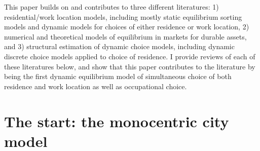 This paper builds on and contributes to three different literatures: 1) residential/work location models, including mostly static equilibrium sorting models and dynamic models for choices of either residence or work location, 2) numerical and theoretical models of equilibrium in markets for durable assets, and 3) structural estimation of dynamic choice models, including dynamic discrete choice models applied to choice of residence. I provide reviews of each of these literatures below, and show that this paper contributes to the literature by being the first dynamic equilibrium model of simultaneous choice of both residence and work location as well as occupational choice.

\section{The start: the monocentric city model}

